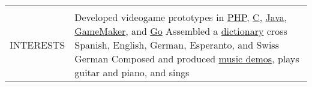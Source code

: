 \documentclass[letterpaper,10pt,oneside]{article}
\newenvironment{body}
{\par\par
\begin{longtable}{p{0.125\textwidth}p{0.84\textwidth}}}
{\par\end{longtable}\par}
\renewcommand{\section}[3]{\\[-0.7cm]\pdfbookmark[2]{#2}{#3}\\%
\raggedleft  %
{\fontsize{9.5pt}{9.5pt}\selectfont\bfseries\raggedright%
\MakeUppercase{#1}}&}
\begin{document}
\begin{body}

\section{Interests}{Interests}{PDF:Interests}

Developed videogame prototypes in \href{https://github.com/lquesada/LifoSource}{PHP}, \href{https://github.com/lquesada/SpaceARMy}{C}, \href{https://github.com/lquesada/RogueCave}{Java}, \href{https://github.com/lquesada/PhysicsEngine}{GameMaker}, and \href{https://github.com/lquesada/Cavernal}{Go} \newline
Assembled a \href{https://github.com/lquesada/Lingvaro}{dictionary} cross Spanish, English, German, Esperanto, and Swiss German \newline
Composed and produced \href{https://github.com/lquesada/music}{music demos}, plays guitar and piano, and sings

\end{body}
\end{document}
